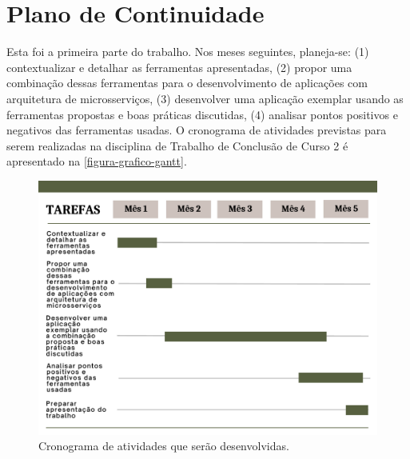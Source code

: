 \chapter{Plano de Continuidade}

Esta foi a primeira parte do trabalho. Nos meses seguintes, planeja-se: (1) contextualizar e detalhar as ferramentas apresentadas, (2) propor uma combinação dessas ferramentas para o desenvolvimento de aplicações com arquitetura de microsserviços, (3) desenvolver uma aplicação exemplar usando as ferramentas propostas e boas práticas discutidas, (4) analisar pontos positivos e negativos das ferramentas usadas. O cronograma de atividades previstas para serem realizadas na disciplina de Trabalho de Conclusão de Curso 2 é apresentado na \autoref{figura-grafico-gantt}.

\begin{figure}[htb]
	\caption{\label{figura-grafico-gantt}Cronograma de atividades que serão desenvolvidas.}
	\begin{center}
	    \includegraphics[scale=0.5]{Imagens/grafico-gantt.pdf}
	\end{center}
\end{figure}